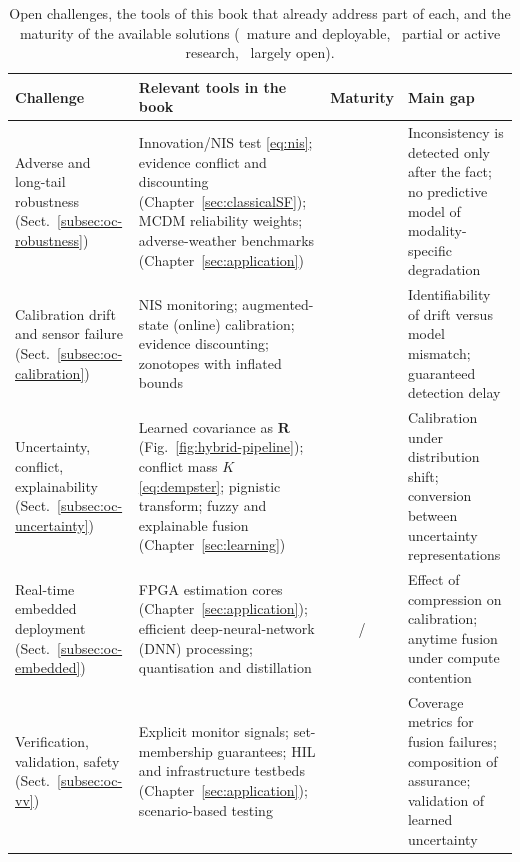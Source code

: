 \documentclass[graybox,envcountchap]{style/SNmono}
\newcommand{\cmark}{\textcolor{MarkerGreen}{\ding{51}}}
\newcommand{\pmark}{\textcolor{MarkerOrange}{\ding{108}}}
\newcommand{\xmark}{\textcolor{red}{\ding{55}}}
\providecommand{\DIFaddbeginFL}{} %
\providecommand{\DIFaddendFL}{} %
\providecommand{\DIFdelbeginFL}{} %
\providecommand{\DIFdelendFL}{} %
\begin{document}
\begin{table}[!t]
\caption{Open challenges, the tools of this book that already address part of each, and the maturity of the available solutions (\cmark\ mature and deployable, \pmark\ partial or active research, \xmark\ largely open).}
\label{tab:challenges-tools}
\footnotesize
\renewcommand{\arraystretch}{1.25}
\setlength{\tabcolsep}{3pt}
\DIFdelbeginFL %
\DIFdelendFL \DIFaddbeginFL \begin{tabular}{>{\raggedright\arraybackslash}p{} >{\raggedright\arraybackslash}p{} c >{\raggedright\arraybackslash}p{}}
\DIFaddendFL \toprule
Challenge & Relevant tools in the book & Maturity & Main gap \\
\midrule
Adverse and long-tail robustness (Sect.~\ref{subsec:oc-robustness}) & Innovation/NIS test \eqref{eq:nis}; evidence conflict and discounting (Chapter~\ref{sec:classicalSF}); MCDM reliability weights; adverse-weather benchmarks (Chapter~\ref{sec:application}) & \pmark & Inconsistency is detected only after the fact; no predictive model of modality-specific degradation \\[2pt]
Calibration drift and sensor failure (Sect.~\ref{subsec:oc-calibration}) & NIS monitoring; augmented-state (online) calibration; evidence discounting; zonotopes with inflated bounds & \pmark & Identifiability of drift versus model mismatch; guaranteed detection delay \\[2pt]
Uncertainty, conflict, explainability (Sect.~\ref{subsec:oc-uncertainty}) & Learned covariance as $\mathbf{R}$ (Fig.~\ref{fig:hybrid-pipeline}); conflict mass $K$ \eqref{eq:dempster}; pignistic transform; fuzzy and explainable fusion (Chapter~\ref{sec:learning}) & \pmark & Calibration under distribution shift; conversion between uncertainty representations \\[2pt]
Real-time embedded deployment (Sect.~\ref{subsec:oc-embedded}) & FPGA estimation cores (Chapter~\ref{sec:application}); efficient deep-neural-network (DNN) processing; quantisation and distillation & \cmark/\pmark & Effect of compression on calibration; anytime fusion under compute contention \\[2pt]
Verification, validation, safety (Sect.~\ref{subsec:oc-vv}) & Explicit monitor signals; set-membership guarantees; HIL and infrastructure testbeds (Chapter~\ref{sec:application}); scenario-based testing & \xmark & Coverage metrics for fusion failures; composition of assurance; validation of learned uncertainty \\[2pt]

\end{tabular}
\end{table}
\end{document}
